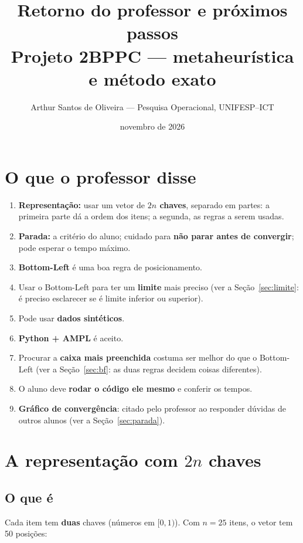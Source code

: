 \documentclass[11pt,a4paper]{article}
\title{\textbf{Retorno do professor e próximos passos}\\[2pt]\large Projeto 2BPPC --- metaheurística e método exato}
\author{Arthur Santos de Oliveira --- Pesquisa Operacional, UNIFESP--ICT}
\date{novembro de 2026}
\begin{document}
\maketitle

\section{O que o professor disse}
\begin{enumerate}[leftmargin=*,itemsep=2pt]
\item \textbf{Representação:} usar um vetor de \textbf{$2n$ chaves}, separado em partes: a primeira parte dá a
  ordem dos itens; a segunda, as regras a serem usadas.
\item \textbf{Parada:} a critério do aluno; cuidado para \textbf{não parar antes de convergir}; pode esperar o
  tempo máximo.
\item \textbf{Bottom-Left} é uma boa regra de posicionamento.
\item Usar o Bottom-Left para ter um \textbf{limite} mais preciso (ver a Seção~\ref{sec:limite}: é preciso
  esclarecer se é limite inferior ou superior).
\item Pode usar \textbf{dados sintéticos}.
\item \textbf{Python + AMPL} é aceito.
\item Procurar a \textbf{caixa mais preenchida} costuma ser melhor do que o Bottom-Left (ver a
  Seção~\ref{sec:bf}: as duas regras decidem coisas diferentes).
\item O aluno deve \textbf{rodar o código ele mesmo} e conferir os tempos.
\item \textbf{Gráfico de convergência}: citado pelo professor ao responder dúvidas de outros alunos (ver a
  Seção~\ref{sec:parada}).
\end{enumerate}

\section{A representação com $2n$ chaves}
\subsection{O que é}
Cada item tem \textbf{duas} chaves (números em $[0,1)$). Com $n=25$ itens, o vetor tem 50 posições:
\end{document}
